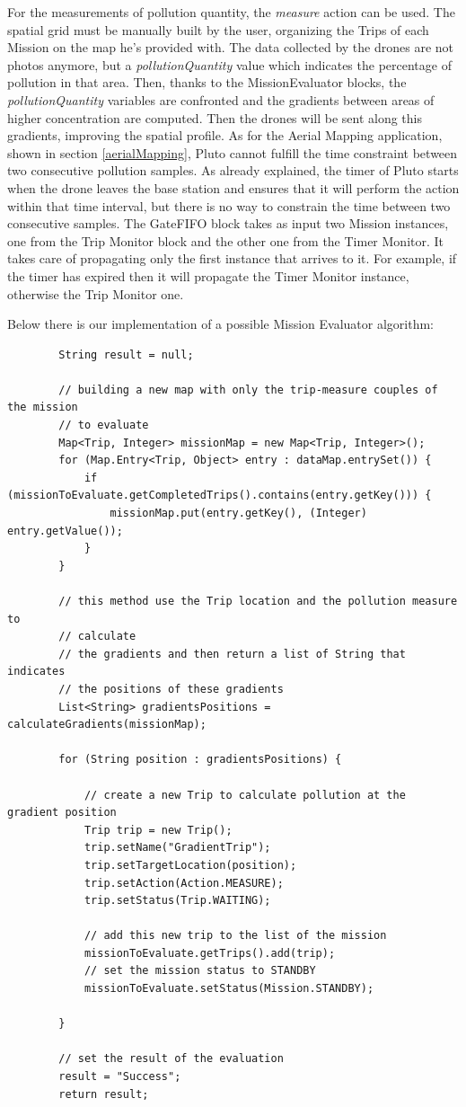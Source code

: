 For the measurements of pollution quantity, the \textit{measure} action can be used.
The spatial grid must be manually built by the user, organizing the Trips of each Mission on the map he's provided with.
The data collected by the drones are not photos anymore, but a \textit{pollutionQuantity} value which indicates the percentage of pollution in that area.
Then, thanks to the MissionEvaluator blocks, the \textit{pollutionQuantity} variables are confronted and the gradients between areas of higher concentration are computed.
Then the drones will be sent along this gradients, improving the spatial profile.
As for the Aerial Mapping application, shown in section \ref{aerialMapping}, Pluto cannot fulfill the time constraint between two consecutive pollution samples.
As already explained, the timer of Pluto starts when the drone leaves the base station and ensures that it will perform the action within that time interval, but there is no way to constrain the time between two consecutive samples.
The GateFIFO block takes as input two Mission instances, one from the Trip Monitor block and the other one from the Timer Monitor.
It takes care of propagating only the first instance that arrives to it.
For example, if the timer has expired then it will propagate the Timer Monitor instance, otherwise the Trip Monitor one.

Below there is our implementation of a possible Mission Evaluator algorithm:
\\

\begin{lstlisting}
		String result = null;

		// building a new map with only the trip-measure couples of the mission
		// to evaluate
		Map<Trip, Integer> missionMap = new Map<Trip, Integer>();
		for (Map.Entry<Trip, Object> entry : dataMap.entrySet()) {
			if (missionToEvaluate.getCompletedTrips().contains(entry.getKey())) {
				missionMap.put(entry.getKey(), (Integer) entry.getValue());
			}
		}

		// this method use the Trip location and the pollution measure to
		// calculate
		// the gradients and then return a list of String that indicates
		// the positions of these gradients
		List<String> gradientsPositions = calculateGradients(missionMap);

		for (String position : gradientsPositions) {

			// create a new Trip to calculate pollution at the gradient position
			Trip trip = new Trip();
			trip.setName("GradientTrip");
			trip.setTargetLocation(position);
			trip.setAction(Action.MEASURE);
			trip.setStatus(Trip.WAITING);

			// add this new trip to the list of the mission
			missionToEvaluate.getTrips().add(trip);
			// set the mission status to STANDBY
			missionToEvaluate.setStatus(Mission.STANDBY);
			
		}
			
		// set the result of the evaluation
		result = "Success";
		return result;
\end{lstlisting}


